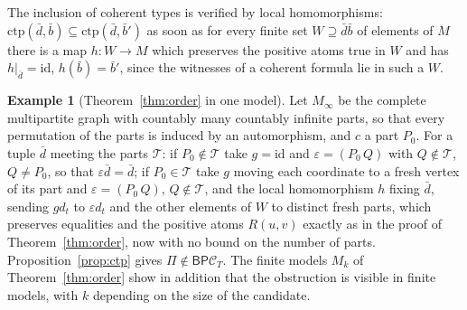 \documentclass[11pt]{amsart}
\theoremstyle{definition}
\newtheorem{ex}[thm]{Example}
\newcommand{\PP}{\mathsf P}
\newcommand{\BB}{\mathsf B}
\newcommand{\cC}{\mathcal C}
\begin{document}
The inclusion of coherent types is verified by local homomorphisms:
$\mathrm{ctp}(\bar d,\bar b)\subseteq\mathrm{ctp}(\bar d,\bar b')$ as
soon as for every finite set $W\supseteq\bar d\bar b$ of elements of $M$
there is a map $h\colon W\to M$ which preserves the positive atoms true
in $W$ and has $h|_{\bar d}=\mathrm{id}$, $h(\bar b)=\bar b'$, since the
witnesses of a coherent formula lie in such a $W$.

\begin{ex}[Theorem~\ref{thm:order} in one model]\label{ex:minfty}
Let $M_\infty$ be the complete multipartite graph with countably many
countably infinite parts, so that every permutation of the parts is
induced by an automorphism, and $c$ a part $P_0$. For a tuple $\bar d$ meeting the
parts $\mathcal T$: if $P_0\notin\mathcal T$ take $g=\mathrm{id}$ and
$\varepsilon=(P_0\,Q)$ with $Q\notin\mathcal T$, $Q\ne P_0$, so that
$\varepsilon\bar d=\bar d$; if $P_0\in\mathcal T$ take $g$ moving each
coordinate to a fresh vertex of its part and $\varepsilon=(P_0\,Q)$,
$Q\notin\mathcal T$, and the local homomorphism $h$ fixing $\bar d$,
sending $g d_t$ to $\varepsilon d_t$ and the other elements of $W$ to
distinct fresh parts, which preserves equalities and the positive atoms
$R(u,v)$ exactly as in the proof of Theorem~\ref{thm:order}, now with no
bound on the number of parts. Proposition~\ref{prop:ctp} gives
$\Pi\notin\BB\PP\cC_T$. The finite models $M_k$ of
Theorem~\ref{thm:order} show in addition that the obstruction is
visible in finite models, with $k$ depending on the size of the
candidate.
\end{ex}
\end{document}
